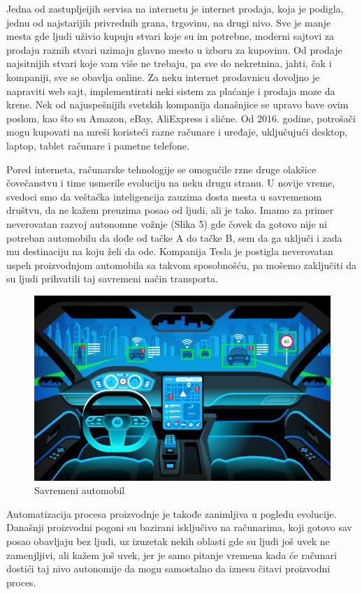 \documentclass[12pt]{article}
\begin{document}
	Jedna od zastupljeijih servisa na internetu je internet prodaja, koja je podigla, jednu od najstarijih privrednih grana, trgovinu, na drugi nivo. Sve je manje mesta gde ljudi uživio kupuju stvari koje su im potrebne, moderni sajtovi za prodaju raznih stvari uzimaju glavno mesto u izboru za kupovinu. Od prodaje najsitnijih stvari koje vam više ne trebaju, pa sve do nekretnina, jahti, čak i kompaniji, sve se obavlja online. Za neku internet prodavnicu dovoljno je napraviti web sajt, implementirati neki sistem za plaćanje i prodaja moze da krene. Nek od najuspešnijih svetskih kompanija današnjice se upravo bave ovim poslom, kao što su Amazon, eBay, AliExpress i slične. Od 2016. godine, potrošači mogu kupovati na mreši koristeći razne računare i uređaje, uključujući desktop, laptop, tablet računare i pametne telefone.

	Pored interneta, računarske tehnologije se omogućile rzne druge olakšice čovečanstvu i time usmerile evoluciju na neku drugu stranu. U novije vreme, svedoci smo da veštačka inteligencija zauzima dosta mesta u savremenom društvu, da ne kažem preuzima posao od ljudi, ali je tako. Imamo za primer neverovatan razvoj autonomne vožnje (Slika 5) gde čovek da gotovo nije ni potreban automobilu da dođe od tačke A do tačke B, sem da ga uključi i zada mu destinaciju na koju želi da ode. Kompanija Tesla je postigla neverovatan uspeh proizvodnjom automobila sa takvom sposobnošću, pa mošemo zaključiti da su ljudi prihvatili taj savremeni način transporta. 
	
	
\begin{figure}
    \centering
    \includegraphics[scale=0.5]{car.jpg}
    \caption{Savremeni automobil}
\end{figure}
	
	Automatizacija procesa proizvodnje je takođe zanimljiva u pogledu evolucije. Današnji proizvodni pogoni su bazirani isključivo na računarima, koji gotovo sav posao obavljaju bez ljudi, uz izuzetak nekih oblasti gde su ljudi još uvek ne zamenjljivi, ali kažem još uvek, jer je samo pitanje vremena kada će računari dostići taj nivo autonomije da mogu samostalno da iznesu čitavi proizvodni proces.
    
\end{document}
